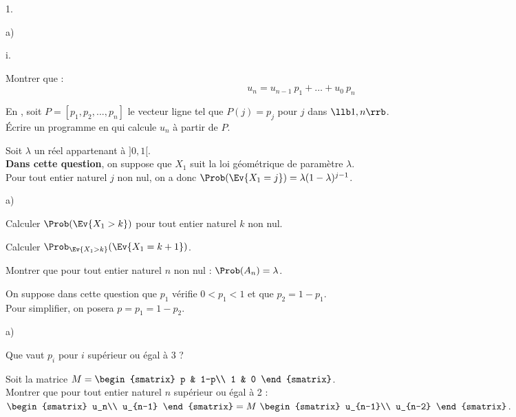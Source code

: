 \documentclass[11pt]{article}%
\begin{document}
\begin{noliste}{1.}
\begin{noliste}{a)}
\begin{nonoliste}{i.}
    \end{nonoliste}

  \item Montrer que :
    \[
    u_n = u_{n-1} \ p_1 + \ldots + u_0 \ p_n
    \]
    
    

  \item En \Scilab{}, soit $P=[p_1,p_2,...,p_n]$ le vecteur ligne tel
    que $P(j)=p_j$ pour $j$ dans $\llb 1,n \rrb$.\\
    Écrire un programme en \Scilab{} qui calcule $u_n$ à partir de
    $P$.

    
\end{noliste}



  
\item Soit $\lambda$ un réel appartenant à $]0,1[$.\\[.2cm]
  \textbf{Dans cette question}, on suppose que $X_1$ suit la loi
  géométrique de paramètre $\lambda$.\\
  Pour tout entier naturel $j$ non nul, on a donc $\Prob(\Ev{X_1=j})=
  \lambda (1-\lambda)^{j-1}$.
  \begin{noliste}{a)}
  \item Calculer $\Prob(\Ev{X_1>k})$ pour tout entier naturel $k$ non nul.

    

  \item Calculer $\Prob_{\Ev{X_1 >k}}(\Ev{X_1=k+1})$.

    

  \item Montrer que pour tout entier naturel $n$ non nul : $\Prob(A_n)
    = \lambda$.

    
  \end{noliste}

\item On suppose dans cette question que $p_1$ vérifie $0<p_1<1$ et
  que $p_2 = 1 - p_1$.\\
  Pour simplifier, on posera $p = p_1 = 1 - p_2$.
  \begin{noliste}{a)}
  \item Que vaut $p_i$ pour $i$ supérieur ou égal à 3 ?

    




  \item Soit la matrice $M =
    \begin{smatrix}
      p & 1-p\\
      1 & 0 
    \end{smatrix}$.\\
    Montrer que pour tout entier naturel $n$ supérieur ou égal à 2 : $
    \begin{smatrix}
      u_n\\ 
      u_{n-1} 
    \end{smatrix}
    = M \ 
    \begin{smatrix}
      u_{n-1}\\
      u_{n-2} 
    \end{smatrix}
    $.


\end{noliste}
\end{noliste}
\end{document}
